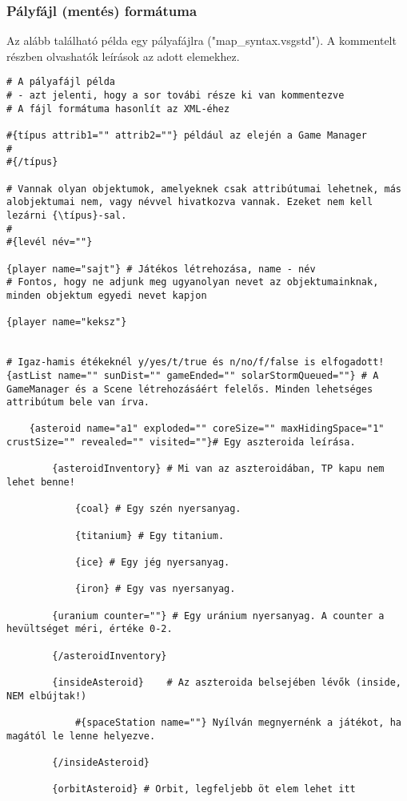 \documentclass[../../projlab]{subfiles}
\begin{document}
\subsubsection{Pályfájl (mentés) formátuma}
Az alább található példa egy pályafájlra ("map\_syntax.vsgstd"). A kommentelt részben olvashatók leírások az adott elemekhez.
\begin{verbatim}
# A pályafájl példa
# - azt jelenti, hogy a sor továbi része ki van kommentezve
# A fájl formátuma hasonlít az XML-éhez 

#{típus attrib1="" attrib2=""} például az elején a Game Manager
#
#{/típus}

# Vannak olyan objektumok, amelyeknek csak attribútumai lehetnek, más alobjektumai nem, vagy névvel hivatkozva vannak. Ezeket nem kell lezárni {\típus}-sal.
#
#{levél név=""}

{player name="sajt"} # Játékos létrehozása, name - név
# Fontos, hogy ne adjunk meg ugyanolyan nevet az objektumainknak, minden objektum egyedi nevet kapjon

{player name="keksz"}


# Igaz-hamis étékeknél y/yes/t/true és n/no/f/false is elfogadott!
{astList name="" sunDist="" gameEnded="" solarStormQueued=""} # A GameManager és a Scene létrehozásáért felelős. Minden lehetséges attribútum bele van írva.

	{asteroid name="a1" exploded="" coreSize="" maxHidingSpace="1" crustSize="" revealed="" visited=""}# Egy aszteroida leírása.
	
		{asteroidInventory} # Mi van az aszteroidában, TP kapu nem lehet benne!
		
			{coal} # Egy szén nyersanyag.
		
			{titanium} # Egy titanium.
		
			{ice} # Egy jég nyersanyag.
		
			{iron} # Egy vas nyersanyag.
		
		{uranium counter=""} # Egy uránium nyersanyag. A counter a hevültséget méri, értéke 0-2.
		
		{/asteroidInventory}
		
		{insideAsteroid} 	# Az aszteroida belsejében lévők (inside, NEM elbújtak!)
		
			#{spaceStation name=""} Nyílván megnyernénk a játékot, ha magától le lenne helyezve.
		
		{/insideAsteroid}
		
		{orbitAsteroid}	# Orbit, legfeljebb öt elem lehet itt
		

\end{verbatim}
\end{document}
